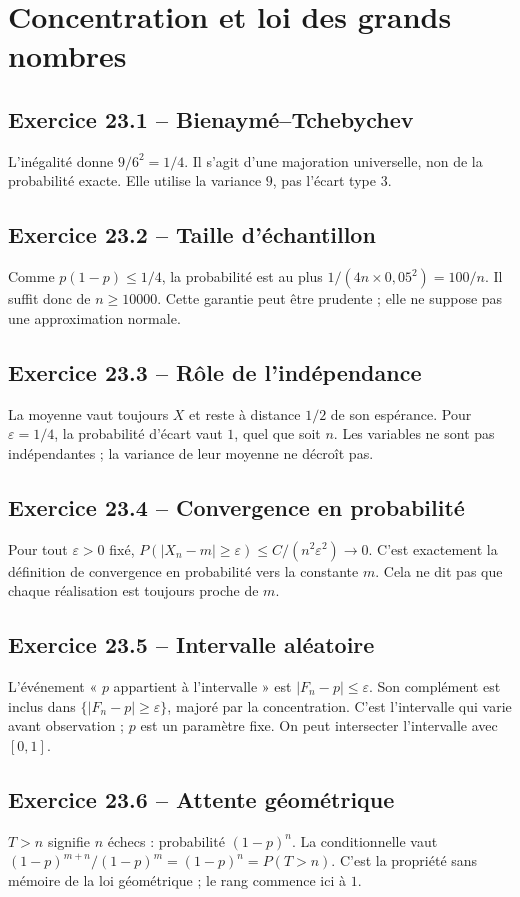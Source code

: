 \chapter{Concentration et loi des grands nombres}
\section*{Exercice 23.1 -- Bienaymé--Tchebychev}
L'inégalité donne $9/6^2=1/4$. Il s'agit d'une majoration universelle, non de la probabilité exacte. Elle utilise la variance $9$, pas l'écart type $3$.

\section*{Exercice 23.2 -- Taille d’échantillon}
Comme $p(1-p)\le1/4$, la probabilité est au plus $1/(4n\times0{,}05^2)=100/n$. Il suffit donc de $n\ge10000$. Cette garantie peut être prudente ; elle ne suppose pas une approximation normale.

\section*{Exercice 23.3 -- Rôle de l’indépendance}
La moyenne vaut toujours $X$ et reste à distance $1/2$ de son espérance. Pour $\varepsilon=1/4$, la probabilité d'écart vaut $1$, quel que soit $n$. Les variables ne sont pas indépendantes ; la variance de leur moyenne ne décroît pas.

\section*{Exercice 23.4 -- Convergence en probabilité}
Pour tout $\varepsilon>0$ fixé, $P(|X_n-m|\ge\varepsilon)\le C/(n^2\varepsilon^2)\to0$. C'est exactement la définition de convergence en probabilité vers la constante $m$. Cela ne dit pas que chaque réalisation est toujours proche de $m$.

\section*{Exercice 23.5 -- Intervalle aléatoire}
L'événement « $p$ appartient à l'intervalle » est $|F_n-p|\le\varepsilon$. Son complément est inclus dans $\{|F_n-p|\ge\varepsilon\}$, majoré par la concentration. C'est l'intervalle qui varie avant observation ; $p$ est un paramètre fixe. On peut intersecter l'intervalle avec $[0,1]$.

\section*{Exercice 23.6 -- Attente géométrique}
$T>n$ signifie $n$ échecs : probabilité $(1-p)^n$. La conditionnelle vaut $(1-p)^{m+n}/(1-p)^m=(1-p)^n=P(T>n)$. C'est la propriété sans mémoire de la loi géométrique ; le rang commence ici à $1$.
